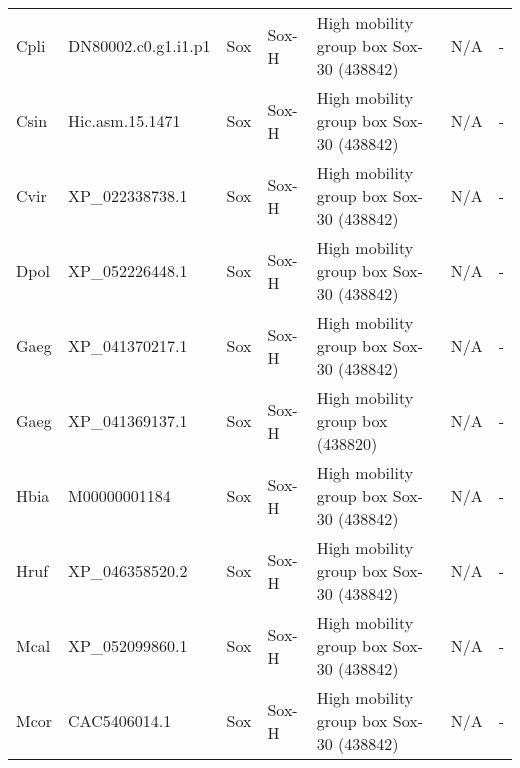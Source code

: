 \documentclass[../main.tex]{subfiles}
\begin{document}
\begin{landscape}
\begin{longtable}{lllllll}
		Cpli           & DN80002.c0.g1.i1.p1   & Sox            & Sox-H               & High mobility group box Sox-30 (438842)     & N/A                                                                    & -                    \\
		Csin           & Hic.asm.15.1471       & Sox            & Sox-H               & High mobility group box Sox-30 (438842)     & N/A                                                                    & -                    \\
		Cvir           & XP\_022338738.1       & Sox            & Sox-H               & High mobility group box Sox-30 (438842)     & N/A                                                                    & -                    \\
		Dpol           & XP\_052226448.1       & Sox            & Sox-H               & High mobility group box Sox-30 (438842)     & N/A                                                                    & -                    \\
		Gaeg           & XP\_041370217.1       & Sox            & Sox-H               & High mobility group box Sox-30 (438842)     & N/A                                                                    & -                    \\
		Gaeg           & XP\_041369137.1       & Sox            & Sox-H               & High mobility group box (438820)            & N/A                                                                    & -                    \\
		Hbia           & M00000001184          & Sox            & Sox-H               & High mobility group box Sox-30 (438842)     & N/A                                                                    & -                    \\
		Hruf           & XP\_046358520.2       & Sox            & Sox-H               & High mobility group box Sox-30 (438842)     & N/A                                                                    & -                    \\
		Mcal           & XP\_052099860.1       & Sox            & Sox-H               & High mobility group box Sox-30 (438842)     & N/A                                                                    & -                    \\
		Mcor           & CAC5406014.1          & Sox            & Sox-H               & High mobility group box Sox-30 (438842)     & N/A                                                                    & -                    \\

\end{longtable}
\end{landscape}
\end{document}
